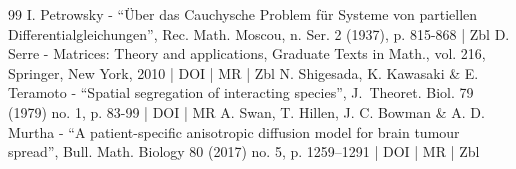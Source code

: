 \begin{thebibliography}{99}
I. Petrowsky - “Über das Cauchysche Problem für Systeme von partiellen Differentialgleichungen”, Rec. Math. Moscou, n. Ser. 2 (1937), p. 815-868 | Zbl
D. Serre - Matrices: Theory and applications, Graduate Texts in Math., vol. 216, Springer, New York, 2010 | DOI | MR | Zbl
N. Shigesada, K. Kawasaki \& E. Teramoto - “Spatial segregation of interacting species”, J. Theoret. Biol. 79 (1979) no. 1, p. 83-99 | DOI | MR
A. Swan, T. Hillen, J. C. Bowman \& A. D. Murtha - “A patient-specific anisotropic diffusion model for brain tumour spread”, Bull. Math. Biology 80 (2017) no. 5, p. 1259–1291 | DOI | MR | Zbl
\end{thebibliography}
